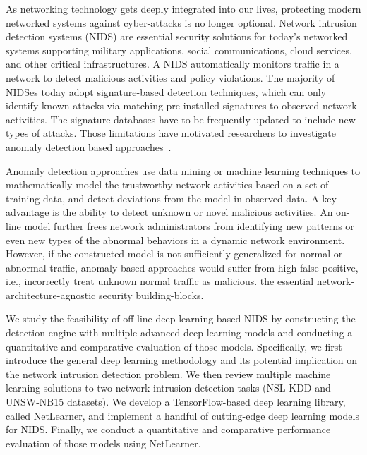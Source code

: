 As networking technology gets deeply integrated into our lives, protecting modern networked systems against cyber-attacks is no longer optional.
Network intrusion detection systems (NIDS) are essential security solutions for today's networked systems supporting military applications,
social communications, cloud services, and other critical infrastructures.
A NIDS automatically monitors traffic in a network to detect malicious activities and policy violations.
The majority of NIDSes today adopt signature-based detection techniques,
which can only identify known attacks via matching pre-installed signatures to observed network activities. 
The signature databases have to be frequently updated to include new types of attacks.
Those limitations have motivated researchers to investigate anomaly detection based approaches~\cite{STL-NIDS, LOF, RankingOutliner, NB-Tree, RampLossKSVCR, GAA-ADS}. 

Anomaly detection approaches use data mining or machine learning techniques to mathematically model the trustworthy network activities based on a set of training data,
and detect deviations from the model in observed data. A key advantage is the ability to detect unknown or novel malicious activities.
An on-line model further frees network administrators from identifying new patterns or even new types of the abnormal behaviors in a dynamic network environment.
However, if the constructed model is not sufficiently generalized for normal or abnormal traffic,
anomaly-based approaches would suffer from high false positive, i.e., incorrectly treat unknown normal traffic as malicious.
the essential network-architecture-agnostic security building-blocks.

We study the feasibility of off-line deep learning based NIDS by constructing the detection engine with
multiple advanced deep learning models and conducting a quantitative and comparative evaluation of those models.
Specifically, we first introduce the general deep learning methodology and its potential implication on the network intrusion detection problem.
We then review multiple machine learning solutions to two network intrusion detection tasks (NSL-KDD and UNSW-NB15 datasets).
We develop a TensorFlow-based deep learning library, called NetLearner, and implement a handful of cutting-edge deep learning models for NIDS.
Finally, we conduct a quantitative and comparative performance evaluation of those models using NetLearner. 
